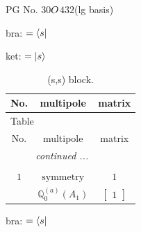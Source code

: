 \documentclass[fleqn,8pt,landscape]{jsarticle}
\begin{document}
\setcounter{MaxMatrixCols}{32}

\renewcommand{\tablename}{Table~}
\renewcommand{\figurename}{Figure~}
\begin{center}
\LARGE
PG No. 30\quad$O_{\rm }$\quad$432$\quad[ cubic ] (lg basis)
\end{center}
bra: $=\bra{s}$

\noindent
ket: $=\ket{s}$
\renewcommand{\arraystretch}{1.6}
\begin{longtable}{ccc}
\caption{(s,s) block.}
 \\
 \hline \hline
No. & multipole & matrix \\ \hline \endfirsthead

\multicolumn{2}{l}{\tablename\ \thetable{}} \\
 \hline \hline
No. & multipole & matrix \\ \hline \endhead

 \hline \hline
\multicolumn{2}{r}{\footnotesize\it continued ...} \\ \endfoot

 \hline \hline
\multicolumn{2}{r}{} \\ \endlastfoot

$ 1 $ & $ \text{symmetry} $ & $ 1 $ \\
$  $ & $ \mathbb{Q}_{0}^{(a)}(A_{1}) $ & $ \begin{bmatrix} 1 \end{bmatrix} $ \\ \hline
\end{longtable}
bra: $=\bra{s}$
\end{document}
